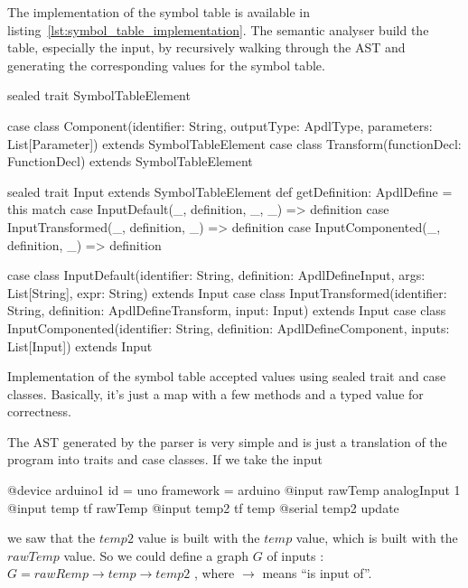 The implementation of the symbol table is available in
listing~\ref{lst:symbol_table_implementation}. The semantic analyser build the
table, especially the input, by recursively walking through the \gls{AST} and
generating the corresponding values for the symbol table.

\begin{listing}[!htbp]
  \centering
\begin{scalacode}
sealed trait SymbolTableElement

case class Component(identifier: String,
                     outputType: ApdlType,
                     parameters: List[Parameter]) extends SymbolTableElement
case class Transform(functionDecl: FunctionDecl) extends SymbolTableElement

sealed trait Input extends SymbolTableElement {
  def getDefinition: ApdlDefine = this match {
    case InputDefault(_, definition, _, _) => definition
    case InputTransformed(_, definition, _) => definition
    case InputComponented(_, definition, _) => definition
  }
}

case class InputDefault(identifier: String,
                        definition: ApdlDefineInput,
                        args: List[String],
                        expr: String) extends Input
case class InputTransformed(identifier: String,
                            definition: ApdlDefineTransform,
                            input: Input) extends Input
case class InputComponented(identifier: String,
                            definition: ApdlDefineComponent,
                            inputs: List[Input]) extends Input
\end{scalacode}
  \caption[Scala's implementation of the symbol table accepted values]{Implementation of the
symbol table accepted values using sealed trait and case classes. Basically,
it's just a map with a few methods and a typed value for
correctness.} \label{lst:symbol_table_implementation}
\end{listing}

The \gls{AST} generated by the parser is very simple and is just a translation of
the program into traits and case classes. If we take the input

\begin{inlineapdl}
@device arduino1 {
    id = uno
    framework = arduino
    @input rawTemp analogInput 1
    @input temp tf rawTemp
    @input temp2 tf temp
    @serial temp2 update
}
\end{inlineapdl}

we saw that the $temp2$ value is built with the $temp$ value, which is built
with the $rawTemp$ value. So we could define a graph $G$ of inputs : $G =
rawRemp \rightarrow temp \rightarrow temp2$ , where $\rightarrow$ means ``is
input of''.

